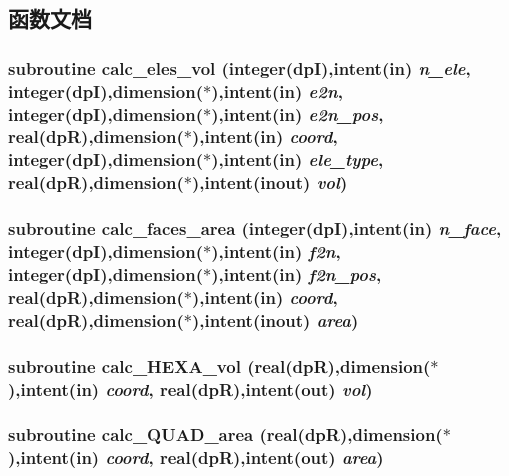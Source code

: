 \subsection{函数文档}
\hypertarget{test_2ftest_8f90_ab0feb0b96896d0783a452ceb0884de54}{
\subsubsection[{calc\_\-eles\_\-vol}]{\setlength{\rightskip}{0pt plus 5cm}subroutine calc\_\-eles\_\-vol (integer(dpI),intent(in) {\em n\_\-ele}, \/  integer(dpI),dimension($\ast$),intent(in) {\em e2n}, \/  integer(dpI),dimension($\ast$),intent(in) {\em e2n\_\-pos}, \/  real(dpR),dimension($\ast$),intent(in) {\em coord}, \/  integer(dpI),dimension($\ast$),intent(in) {\em ele\_\-type}, \/  real(dpR),dimension($\ast$),intent(inout) {\em vol})}}
\label{test_2ftest_8f90_ab0feb0b96896d0783a452ceb0884de54}
\hypertarget{test_2ftest_8f90_a65b36ff25ffa106dab5c6b52332982e1}{
\subsubsection[{calc\_\-faces\_\-area}]{\setlength{\rightskip}{0pt plus 5cm}subroutine calc\_\-faces\_\-area (integer(dpI),intent(in) {\em n\_\-face}, \/  integer(dpI),dimension($\ast$),intent(in) {\em f2n}, \/  integer(dpI),dimension($\ast$),intent(in) {\em f2n\_\-pos}, \/  real(dpR),dimension($\ast$),intent(in) {\em coord}, \/  real(dpR),dimension($\ast$),intent(inout) {\em area})}}
\label{test_2ftest_8f90_a65b36ff25ffa106dab5c6b52332982e1}
\hypertarget{test_2ftest_8f90_aedcabc3101935ffa79dac989cdf8cf09}{
\subsubsection[{calc\_\-HEXA\_\-vol}]{\setlength{\rightskip}{0pt plus 5cm}subroutine calc\_\-HEXA\_\-vol (real(dpR),dimension($\ast$),intent(in) {\em coord}, \/  real(dpR),intent(out) {\em vol})}}
\label{test_2ftest_8f90_aedcabc3101935ffa79dac989cdf8cf09}
\hypertarget{test_2ftest_8f90_a638fb93022b93255d8000bacff09a674}{
\subsubsection[{calc\_\-QUAD\_\-area}]{\setlength{\rightskip}{0pt plus 5cm}subroutine calc\_\-QUAD\_\-area (real(dpR),dimension($\ast$),intent(in) {\em coord}, \/  real(dpR),intent(out) {\em area})}}
